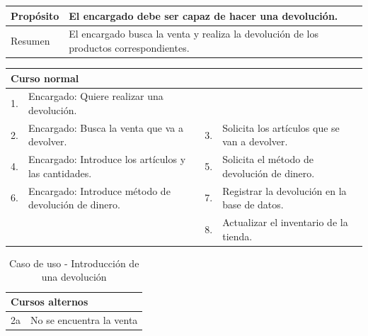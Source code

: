 \begin{table}[H]
	\centering
	\begin{tabular}{| m{} | m{} | m{} | m{} |}
		\hline
		Propósito & \multicolumn{3}{m{0.67\textwidth}|}{El encargado debe ser capaz de hacer una devolución.}  \\ 
		\hline
		Resumen & \multicolumn{3}{m{0.67\textwidth}|}{El encargado busca la venta y realiza la devolución de los productos correspondientes. } \\ 
		\hline
	\end{tabular}
\end{table}


\begin{table}[H]
	\centering
	\begin{tabular}{| m{} | m{} | m{} | m{} |}
		\hline
		\multicolumn{4}{|m{0.9\textwidth}|}{Curso normal}     \\ 
		\hline
		1. & Encargado: Quiere realizar una devolución. &  &    \\ 
		\hline
		2. & Encargado: Busca la venta que va a devolver. & 3. &  Solicita los artículos que se van a devolver.  \\ 
		\hline
		4. & Encargado: Introduce los artículos y las cantidades. & 5. &  Solicita el método de devolución de dinero.  \\ 
		\hline
		6. & Encargado: Introduce método de devolución de dinero. & 7. & Registrar la devolución en la base de datos.  \\ 
		\hline
		&  & 8. &  Actualizar el inventario de la tienda.  \\ 
		\hline
	\end{tabular}
\end{table}

\begin{table}[H]
	\centering
	\begin{tabular}{| m{} | m{} | m{} | m{} |}
		\hline
		\multicolumn{4}{|m{0.9\textwidth}|}{Cursos alternos}     \\ 
		\hline
		2a & \multicolumn{3}{m{0.67\textwidth}|}{No se encuentra la venta} \\ 
		\hline
	\end{tabular}
	\caption{Caso de uso - Introducción de una devolución}
\end{table}

\newpage



